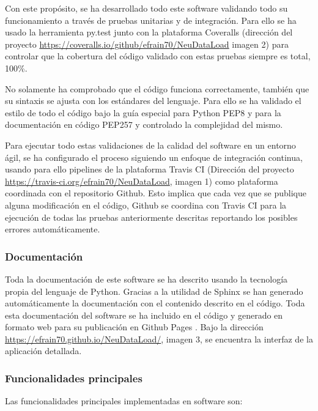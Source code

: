 Con este propósito, se ha desarrollado todo este software validando todo su funcionamiento a través de pruebas unitarias y de integración. Para ello se ha usado la herramienta py.test \cite{Pytest:Documentation} junto con la plataforma Coveralls \cite{CoverallsStatistics} (dirección del proyecto \url{https://coveralls.io/github/efrain70/NeuDataLoad} imagen 2) para controlar que la cobertura del código validado con estas pruebas siempre es total, 100\%.



No solamente ha comprobado que el código funciona correctamente, también que su sintaxis se ajusta con los estándares del lenguaje. Para ello se ha validado el estilo de todo el código bajo la guía especial para Python PEP8 \cite{PEPPython.orgb} y para la documentación en código PEP257 \cite{PEPPython.org} y controlado la complejidad del mismo.

Para ejecutar todo estas validaciones de la calidad del software en un entorno ágil, se ha  configurado el proceso siguiendo un enfoque de integración continua, usando para ello pipelines de la plataforma Travis CI \cite{TravisConfidence} (Dirección del proyecto \url{https://travis-ci.org/efrain70/NeuDataLoad}, imagen 1) como plataforma coordinada con el repositorio Github. Esto implica que cada vez que se publique alguna modificación en el código, Github se coordina con Travis CI para la ejecución de todas las pruebas anteriormente descritas reportando los posibles errores automáticamente.

\subsubsection{Documentación}
Toda la documentación de este software se ha descrito usando la tecnología propia del lenguaje de Python. Gracias a la utilidad de Sphinx \cite{OverviewDocumentation} se han generado automáticamente la documentación con el contenido descrito en el código. Toda esta documentación del software se ha incluido en el código y generado en formato web para su publicación en Github Pages \cite{GitHubLive.}. Bajo la dirección \url{https://efrain70.github.io/NeuDataLoad/}, imagen 3, se encuentra la interfaz de la aplicación detallada.

\subsubsection{Funcionalidades principales}
Las funcionalidades principales implementadas en software son:

